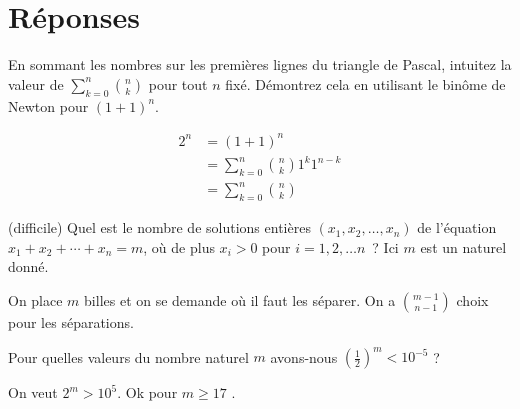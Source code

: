 \section{Réponses} %
\begin{frame}
  \begin{enonce}
    En sommant les nombres sur les premières lignes du triangle de Pascal, intuitez la valeur de \(\sum_{k=0}^{n} \binom{n}{k}\) pour tout \(n\) fixé. Démontrez cela en utilisant le binôme de Newton pour \((1+1)^n\).
  \end{enonce}

  \begin{answer}
    \begin{minipage}{0.49\linewidth}
  \end{minipage}
  \begin{minipage}{0.49\linewidth}
  \begin{align*}
    2^{n}  &= (1+1)^{n}\\
           &=   \sum_{k=0}^{n} \binom{n}{k} 1^{k} 1^{n-k} \\
    &= \sum_{k=0}^{n} \binom{n}{k}
  \end{align*}
\end{minipage}
\end{answer}
\end{frame}
\begin{frame}
  \begin{enonce}
  (difficile) Quel est le nombre de solutions enti\`eres $(x_1,x_2,\ldots, x_n)$ de l'équation $x_1+x_2+\cdots +x_n=m$, o\`u de plus $x_i>0$ pour $i=1,2,\ldots n$~? Ici $m$ est un naturel donné.
\end{enonce}

\begin{answer}
On place \(m\) billes et on se demande où il faut les \og séparer\fg{}. On a \(\binom{m-1}{n-1}\) choix pour les séparations.
\end{answer}
\end{frame}
\begin{frame}
  \begin{enonce}
  Pour quelles valeurs du nombre naturel $m$ avons-nous $\left(\frac{1}{2}\right)^m < 10^{-5}$ ?
\end{enonce}

\begin{answer}
 On veut \(2^{m} > 10^{5}\). Ok pour \(m \geq 17\) .
\end{answer}
\end{frame}
